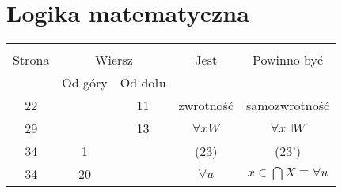 \documentclass[a4paper,11pt]{article}
\begin{document}
\vspace{\spaceTwo}










\newpage
\section{Logika matematyczna}

\vspace{\spaceTwo}






\begin{center}

  \begin{tabular}{|c|c|c|c|c|}
    \hline
    & \multicolumn{2}{c|}{} & & \\
    Strona & \multicolumn{2}{c|}{Wiersz} & Jest
                              & Powinno być \\ \cline{2-3}
    & Od góry & Od dołu & & \\
    \hline
    22  & & 11 & zwrotność & samozwrotność \\
    29  & & 13 & $\forall x W$ & $\forall x \exists W$ \\
    34  &  1 & & (23) & (23') \\
    34  & 20 & & $\forall u$ & $x \in \bigcap X \equiv \forall u$ \\
    \hline
  \end{tabular}

\end{center}

\vspace{\spaceTwo}
\end{document}
